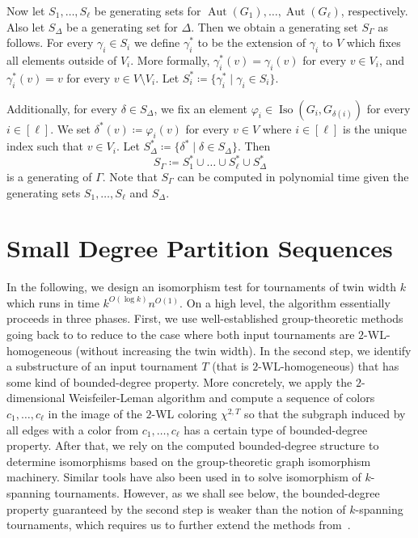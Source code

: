 \documentclass{theoretics}
\newcommand{\WL}[2]{\chi^{#1,#2}}
\DeclareMathOperator{\Aut}{Aut}
\DeclareMathOperator{\Iso}{Iso}
\begin{document}
Now let $S_1,\dots,S_\ell$ be generating sets for $\Aut(G_1),\dots,\Aut(G_\ell)$, respectively.
Also let $S_\Delta$ be a generating set for $\Delta$.
Then we obtain a generating set $S_\Gamma$ as follows.
For every $\gamma_i \in S_i$ we define $\gamma_i^*$ to be the extension of $\gamma_i$ to $V$ which fixes all elements outside of $V_i$.
More formally, $\gamma_i^*(v) = \gamma_i(v)$ for every $v \in V_i$, and $\gamma_i^*(v) = v$ for every $v \in V \setminus V_i$.
Let $S_i^* \coloneqq \{\gamma_i^* \mid \gamma_i \in S_i\}$.

Additionally, for every $\delta \in S_\Delta$, we fix an element $\varphi_i \in \Iso(G_i,G_{\delta(i)})$ for every $i \in [\ell]$.
We set $\delta^*(v) \coloneqq \varphi_i(v)$ for every $v \in V$ where $i \in [\ell]$ is the unique index such that $v \in V_i$.
Let $S_\Delta^* \coloneqq \{\delta^* \mid \delta \in S_\Delta\}$.
Then
\[S_\Gamma \coloneqq S_1^* \cup \dots \cup S_\ell^* \cup S_\Delta^*\]
is a generating of $\Gamma$.
Note that $S_\Gamma$ can be computed in polynomial time given the generating sets $S_1,\dots,S_\ell$ and $S_\Delta$.


\section{Small Degree Partition Sequences}
\label{sec:partitions}

In the following, we design an isomorphism test for tournaments of twin width $k$ which runs in time $k^{O(\log k)}n^{O(1)}$.
On a high level, the algorithm essentially proceeds in three phases.
First, we use well-established group-theoretic methods going back to \cite{BabaiL83,Luks82} to reduce to the case where both input tournaments are $2$-WL-homogeneous (without increasing the twin width).
In the second step, we identify a substructure of an input tournament $T$ (that is $2$-WL-homogeneous) that has some kind of bounded-degree property.
More concretely, we apply the $2$-dimensional Weisfeiler-Leman algorithm and compute a sequence of colors $c_1,\dots,c_\ell$ in the image of the $2$-WL coloring $\WL{2}{T}$ so that the subgraph induced by all edges with a color from $c_1,\dots,c_\ell$ has a certain type of bounded-degree property.
After that, we rely on the computed bounded-degree structure to determine isomorphisms based on the group-theoretic graph isomorphism machinery.
Similar tools have also been used in \cite{ArvindPR25} to solve isomorphism of $k$-spanning tournaments.
However, as we shall see below, the bounded-degree property guaranteed by the second step is weaker than the notion of $k$-spanning tournaments, which requires us to further extend the methods from~\cite{ArvindPR25}.
\end{document}
